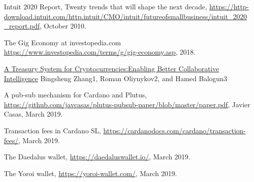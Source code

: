 \documentclass{article}
\begin{document}
\begin{thebibliography}{99}

 Intuit 2020 Report, Twenty trends that will shape the next decade, \url{https://http-download.intuit.com/http.intuit/CMO/intuit/futureofsmallbusiness/intuit_2020_report.pdf}, October 2010.

 The Gig Economy at investopedia.com \url{https://www.investopedia.com/terms/g/gig-economy.asp}, 2018.

\href{https://www.lancaster.ac.uk/staff/zhangb2/treasury.pdf}{A Treasury System for Cryptocurrencies:Enabling Better Collaborative Intelligence}
Bingsheng Zhang1, Roman Oliynykov2, and Hamed Balogun3

 A pub-sub mechanism for Cardano and Plutus, \url{https://github.com/javcasas/plutus-pubsub-paper/blob/master/paper.pdf}, Javier Casas, March 2019.

 Transaction fees in Cardano SL, \url{https://cardanodocs.com/cardano/transaction-fees/}, March 2019.

 The Daedalus wallet, \url{https://daedaluswallet.io/}, March 2019.

 The Yoroi wallet, \url{https://yoroi-wallet.com/}, March 2019.

\end{thebibliography}
\end{document}
